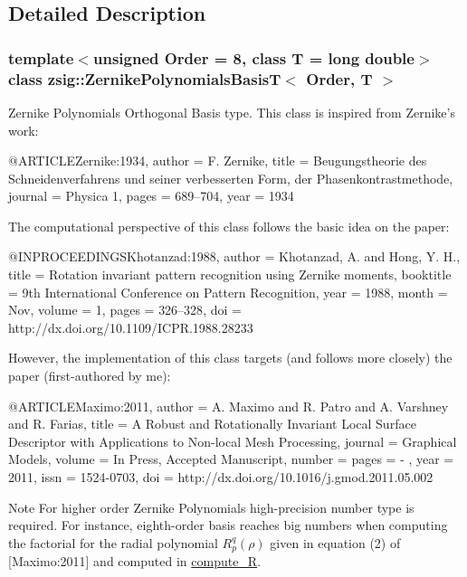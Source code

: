 \subsection{Detailed Description}
\subsubsection*{template$<$unsigned Order = 8, class T = long double$>$ class zsig::ZernikePolynomialsBasisT$<$ Order, T $>$}

Zernike Polynomials Orthogonal Basis type. This class is inspired from Zernike's work: \begin{DoxyVerb}
@ARTICLE{Zernike:1934,
  author = {{F}. {Z}ernike},
  title = {{B}eugungstheorie des {S}chneidenverfahrens und seiner verbesserten {F}orm, der {P}hasenkontrastmethode},
  journal = {Physica 1},
  pages = {689--704},
  year = {1934}
}   \end{DoxyVerb}
 The computational perspective of this class follows the basic idea on the paper: \begin{DoxyVerb}
@INPROCEEDINGS{Khotanzad:1988,
  author = {{K}hotanzad, {A}. and {H}ong, {Y}. {H}.},
  title = {Rotation invariant pattern recognition using {Z}ernike moments},
  booktitle = {9th {I}nternational {C}onference on {P}attern {R}ecognition},
  year = {1988},
  month = {Nov},
  volume = {1},
  pages = {326--328},
  doi = {http://dx.doi.org/10.1109/ICPR.1988.28233}
}   \end{DoxyVerb}
 However, the implementation of this class targets (and follows more closely) the paper (first-\/authored by me): \begin{DoxyVerb}
@ARTICLE{Maximo:2011,
  author = {A. Maximo and R. Patro and A. Varshney and R. Farias},
  title = {A Robust and Rotationally Invariant Local Surface Descriptor with Applications to Non-local Mesh Processing},
  journal = {Graphical Models},
  volume = {In Press, Accepted Manuscript},
  number = {}
  pages = { - },
  year = {2011},
  issn = {1524-0703},
  doi = {http://dx.doi.org/10.1016/j.gmod.2011.05.002}
}   \end{DoxyVerb}
 \begin{DoxyNote}{Note}
For higher order Zernike Polynomials high-\/precision number type is required. For instance, eighth-\/order basis reaches big numbers when computing the factorial for the radial polynomial $R_{p}^{q}(\rho)$ given in equation (2) of \mbox{[}Maximo:2011\mbox{]} and computed in \hyperlink{classzsig_1_1ZernikePolynomialsBasisT_aed020103343d1c0210cc929069b07559}{compute\_\-R}.
\end{DoxyNote}

